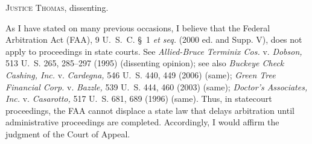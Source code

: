 
\setcounter{page}{363}

  \textsc{Justice Thomas,} dissenting.

  As I have stated on many previous occasions, I believe that the
Federal Arbitration Act (FAA), 9 U.~S.~C. \S~1 \emph{et seq.} (2000
ed. and Supp. V), does not apply to proceedings in state courts.
See \emph{Allied-Bruce Terminix Cos.} v. \emph{Dobson,} 513 U.~S. 265,
285--297 (1995) (dissenting opinion); see also \emph{Buckeye Check Cashing,
Inc.} v. \emph{Cardegna,} 546 U.~S. 440, 449 (2006) (same); \emph{Green Tree
Financial Corp.} v. \emph{Bazzle,} 539 U.~S. 444, 460 (2003) (same);
\emph{Doctor's Associates, Inc.} v. \emph{Casarotto,} 517 U.~S. 681,
689 (1996) (same). Thus, in statecourt proceedings, the FAA cannot
displace a state law that delays arbitration until administrative
proceedings are completed. Accordingly, I would affirm the judgment of
the Court of Appeal.

